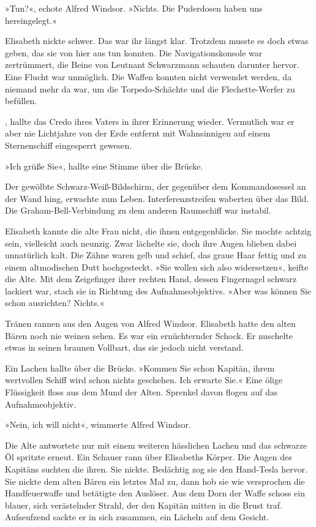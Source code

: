 »Tun?«, echote Alfred Windsor. »Nichts. Die Puderdosen haben uns
hereingelegt.«

Elisabeth nickte schwer. Das war ihr längst klar. Trotzdem musste
es doch etwas geben, das sie von hier aus tun konnten. Die
Navigationskonsole war zertrümmert, die Beine von Leutnant
Schwarzmann schauten darunter hervor. Eine Flucht war unmöglich.
Die Waffen konnten nicht verwendet werden, da niemand mehr da war,
um die Torpedo-Schächte und die Flechette-Werfer zu befüllen.

, hallte das
Credo ihres Vaters in ihrer Erinnerung wieder. Vermutlich war er
aber nie Lichtjahre von der Erde entfernt mit Wahnsinnigen auf
einem Sternenschiff eingesperrt gewesen.

\bigpar

»Ich grüße Sie«, hallte eine Stimme über die Brücke.

Der gewölbte Schwarz-Weiß-Bildschirm, der gegenüber dem
Kommandosessel an der Wand hing, erwachte zum Leben.
Interferenzstreifen waberten über das Bild. Die
Graham-Bell-Verbindung zu dem anderen Raumschiff war instabil.

Elisabeth kannte die alte Frau nicht, die ihnen entgegenblicke. Sie
mochte achtzig sein, vielleicht auch neunzig. Zwar lächelte sie,
doch ihre Augen blieben dabei unnatürlich kalt. Die Zähne waren
gelb und schief, das graue Haar fettig und zu einem altmodischen
Dutt hochgesteckt. »Sie wollen sich also widersetzen«, keifte die
Alte. Mit dem Zeigefinger ihrer rechten Hand, dessen Fingernagel
schwarz lackiert war, stach sie in Richtung des Aufnahmeobjektivs.
»Aber was können Sie schon ausrichten? Nichts.«

Tränen rannen aus den Augen von Alfred Windsor. Elisabeth hatte den
alten Bären noch nie weinen sehen. Es war ein ernüchternder Schock.
Er nuschelte etwas in seinen braunen Vollbart, das sie jedoch nicht
verstand.

Ein Lachen hallte über die Brücke. »Kommen Sie schon Kapitän, ihrem
wertvollen Schiff wird schon nichts geschehen. Ich erwarte Sie.«
Eine ölige Flüssigkeit floss aus dem Mund der Alten. Sprenkel davon
flogen auf das Aufnahmeobjektiv.

»Nein, ich will nicht«, wimmerte Alfred Windsor.

Die Alte antwortete nur mit einem weiteren hässlichen Lachen und
das schwarze Öl spritzte erneut. Ein Schauer rann über Elisabeths
Körper. Die Augen des Kapitäns suchten die ihren. Sie nickte.
Bedächtig zog sie den Hand-Tesla hervor. Sie nickte dem alten Bären
ein letztes Mal zu, dann hob sie wie versprochen die Handfeuerwaffe
und betätigte den Auslöser. Aus dem Dorn der Waffe schoss ein
blauer, sich verästelnder Strahl, der den Kapitän mitten in die
Brust traf. Aufseufzend sackte er in sich zusammen, ein Lächeln auf
dem Gesicht.

